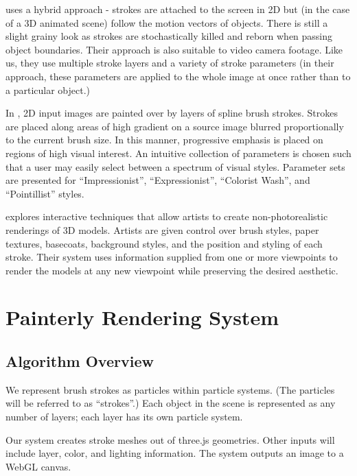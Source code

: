 \documentclass[conference]{acmsiggraph}
\begin{document}
\cite{Lu:2010:IPS:1730804.1730825} uses a hybrid approach - strokes are
attached to the screen in 2D but (in the case of a 3D animated scene) follow
the motion vectors of objects. There is still a slight grainy look as strokes
are stochastically killed and reborn when passing object boundaries. Their
approach is also suitable to video camera footage. Like us, they use multiple
stroke layers and a variety of stroke parameters (in their approach, these
parameters are applied to the whole image at once rather than to a particular
object.)

In \cite{Hertzmann:1998:PRC:280814.280951}, 2D input images are painted over
by layers of spline brush strokes. Strokes are placed along areas of high
gradient on a source image blurred proportionally to the current brush size. In
this manner, progressive emphasis is  placed on regions of high visual
interest. An intuitive collection of parameters is chosen such that a user may
easily select between a spectrum of visual styles. Parameter sets are presented
for ``Impressionist'', ``Expressionist'', ``Colorist Wash'', and ``Pointillist''
styles.

\cite{Kalnins:2002:WND:566570.566648} explores interactive techniques that
allow artists to create non-photorealistic renderings of 3D models. Artists are
given control over brush styles, paper textures, basecoats, background styles,
and the position and styling of each stroke. Their system uses information
supplied from one or more viewpoints to render the models at any new viewpoint
while preserving the desired aesthetic.


\section{Painterly Rendering System}

\subsection{Algorithm Overview}

We represent brush strokes as particles within particle systems. (The particles
will be referred to as ``strokes''.) Each object in the scene is represented as
any number of layers; each layer has its own particle system.

Our system creates stroke meshes out of three.js geometries. Other inputs will
include layer, color, and lighting information. The system outputs an image to
a WebGL canvas.
\end{document}
